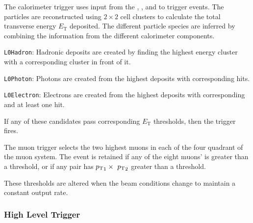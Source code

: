 The \lone calorimeter trigger uses input from the \spd, \presh, \ecal and \hcal to trigger events. The particles are reconstructed using $2\times2$ cell clusters to calculate the total transverse energy $E_{\text{T}}$ deposited. 
The different particle species are inferred by combining the information from the different calorimeter components.
\begin{description}
\item \texttt{L0Hadron}: Hadronic deposits are created by finding the highest energy \hcal cluster with a corresponding \ecal cluster in front of it.  
\item \texttt{L0Photon}: Photons are created from the highest \ecal deposits with corresponding \presh hits. 
\item \texttt{L0Electron}: Electrons are created from the highest \ecal deposits with corresponding \presh and at least one \spd hit. 
\end{description}
If any of these candidates pass corresponding $E_{\text{T}}$ thresholds, then the trigger fires. 

The \lone muon trigger selects the two highest \pt muons in each of the four quadrant of the muon system. The event is retained if any of the eight muons' \pt is greater than a threshold, or if any pair has $\mbox{$p_{\mathrm{ T}}$}_{1} \times\ \mbox{$p_{\mathrm{ T}}$}_{2}$ greater than a threshold.

These thresholds are altered when the beam conditions change to maintain a constant \lone output rate.

\subsubsection{High Level Trigger}

